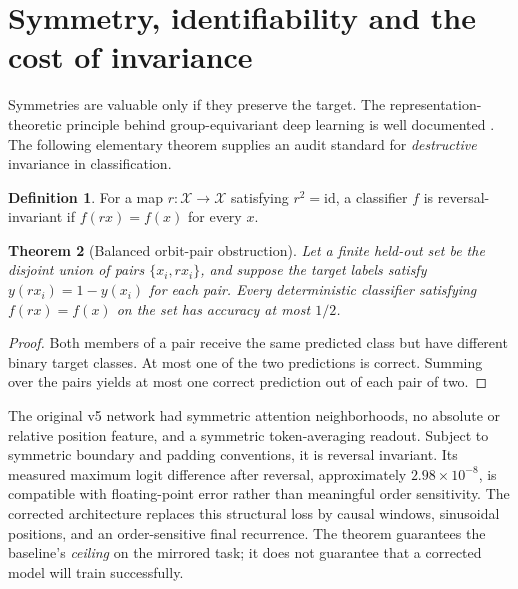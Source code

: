 \documentclass[11pt,a4paper]{article}
\theoremstyle{plain}\newtheorem{theorem}{Theorem}[section]\newtheorem{proposition}[theorem]{Proposition}\newtheorem{lemma}[theorem]{Lemma}
\theoremstyle{definition}\newtheorem{definition}[theorem]{Definition}\newtheorem{remark}[theorem]{Remark}\newtheorem{counterexample}[theorem]{Counterexample}
\begin{document}
\section{Symmetry, identifiability and the cost of invariance}
Symmetries are valuable only if they preserve the target. The representation-theoretic principle behind group-equivariant deep learning is well documented \cite{cohen2016,bronstein2021}. The following elementary theorem supplies an audit standard for \emph{destructive} invariance in classification.

\begin{definition}
For a map $r:\mathcal X\to\mathcal X$ satisfying $r^2=\mathrm{id}$, a classifier $f$ is reversal-invariant if $f(rx)=f(x)$ for every $x$.
\end{definition}
\begin{theorem}[Balanced orbit-pair obstruction]\label{th:reverse}
Let a finite held-out set be the disjoint union of pairs $\{x_i,rx_i\}$, and suppose the target labels satisfy $y(rx_i)=1-y(x_i)$ for each pair. Every deterministic classifier satisfying $f(rx)=f(x)$ on the set has accuracy at most $1/2$.
\end{theorem}
\begin{proof}
Both members of a pair receive the same predicted class but have different binary target classes. At most one of the two predictions is correct. Summing over the pairs yields at most one correct prediction out of each pair of two.
\end{proof}
The original v5 network had symmetric attention neighborhoods, no absolute or relative position feature, and a symmetric token-averaging readout. Subject to symmetric boundary and padding conventions, it is reversal invariant. Its measured maximum logit difference after reversal, approximately $2.98\times10^{-8}$, is compatible with floating-point error rather than meaningful order sensitivity. The corrected architecture replaces this structural loss by causal windows, sinusoidal positions, and an order-sensitive final recurrence. The theorem guarantees the baseline's \emph{ceiling} on the mirrored task; it does not guarantee that a corrected model will train successfully.
\end{document}
